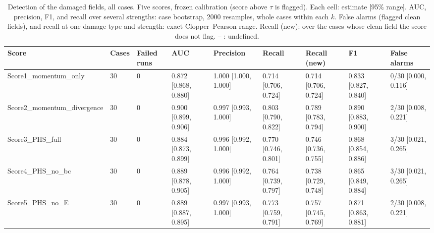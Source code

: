 \begin{table}
\caption{Detection of the damaged fields, all cases. Five scores, frozen calibration (score above $\tau$ is flagged). Each cell: estimate [95\% range]. AUC, precision, F1, and recall over several strengths: case bootstrap, 2000 resamples, whole cases within each $k$. False alarms (flagged clean fields), and recall at one damage type and strength: exact Clopper--Pearson range. Recall (new): over the cases whose clean field the score does not flag. -- : undefined.}
\label{tab:benchmark_metrics_overall}
\begin{tabular}{lllllllll}
\toprule
Score & Cases & Failed runs & AUC & Precision & Recall & Recall (new) & F1 & False alarms \\
\midrule
Score1\_momentum\_only & 30 & 0 & 0.872 [0.868, 0.880] & 1.000 [1.000, 1.000] & 0.714 [0.706, 0.724] & 0.714 [0.706, 0.724] & 0.833 [0.827, 0.840] & 0/30 [0.000, 0.116] \\
Score2\_momentum\_divergence & 30 & 0 & 0.900 [0.899, 0.906] & 0.997 [0.993, 1.000] & 0.803 [0.790, 0.822] & 0.789 [0.783, 0.794] & 0.890 [0.883, 0.900] & 2/30 [0.008, 0.221] \\
Score3\_PHS\_full & 30 & 0 & 0.884 [0.873, 0.899] & 0.996 [0.992, 1.000] & 0.770 [0.746, 0.801] & 0.746 [0.736, 0.755] & 0.868 [0.854, 0.886] & 3/30 [0.021, 0.265] \\
Score4\_PHS\_no\_bc & 30 & 0 & 0.889 [0.878, 0.905] & 0.996 [0.992, 1.000] & 0.764 [0.739, 0.797] & 0.738 [0.729, 0.748] & 0.865 [0.849, 0.884] & 3/30 [0.021, 0.265] \\
Score5\_PHS\_no\_E & 30 & 0 & 0.889 [0.887, 0.895] & 0.997 [0.993, 1.000] & 0.773 [0.759, 0.791] & 0.757 [0.745, 0.769] & 0.871 [0.863, 0.881] & 2/30 [0.008, 0.221] \\
\bottomrule
\end{tabular}
\end{table}
